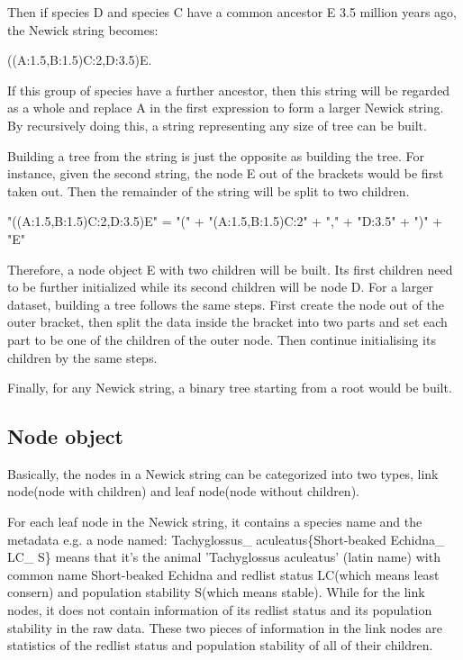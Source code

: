 \documentclass[a4paper,11pt,twoside]{report}
\begin{document}
Then if species D and species C have a common ancestor E 3.5 million years ago, the Newick string becomes: 
\begin{center}
	((A:1.5,B:1.5)C:2,D:3.5)E. 
\end{center}
If this group of species have a further ancestor, then this string will be regarded as a whole and replace A in the first expression to form a larger Newick string. By recursively doing this, a string representing any size of tree can be built.

Building a tree from the string is just the opposite as building the tree. For instance, given the second string, the node E out of the brackets would be first taken out. Then the remainder of the string will be split to two children.

\begin{center}
	"((A:1.5,B:1.5)C:2,D:3.5)E" =  "(" + "(A:1.5,B:1.5)C:2" + "," + "D:3.5" + ")" + "E"
\end{center}

Therefore, a node object E with two children will be built. Its first children need to be further initialized while its second children will be node D. For a larger dataset, building a tree follows the same steps. First create the node out of the outer bracket, then split the data inside the bracket into two parts and set each part to be one of the children of the outer node. Then continue initialising its children by the same steps.

Finally, for any Newick string, a binary tree starting from a root would be built. 

\subsection{Node object}

Basically, the nodes in a Newick string can be categorized into two types, link node(node with children) and leaf node(node without children).

For each leaf node in the Newick string, it contains a species name and the metadata e.g. a node named: Tachyglossus\_ aculeatus\{Short-beaked Echidna\_ LC\_ S\} means that it's the animal 'Tachyglossus aculeatus' (latin name) with common name Short-beaked Echidna and redlist status LC(which means least consern) and population stability S(which means stable). While for the link nodes, it does not contain information of its redlist status and its population stability in the raw data. These two pieces of information in the link nodes are statistics of the redlist status and population stability of all of their children. 
\end{document}
